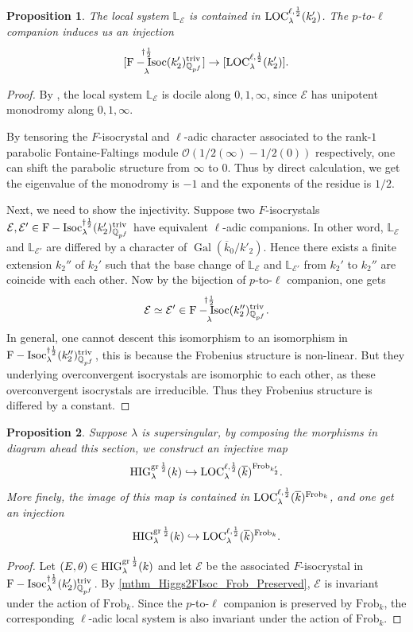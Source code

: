 \documentclass[12pt,twoside]{book}
\theoremstyle{plain}
\newtheorem{proposition}[proposition]{Proposition}
\theoremstyle{definition}
\theoremstyle{remark}
\newcommand{\bL}{{\mathbb L}}
\newcommand{\bQ}{{\mathbb Q}}
\newcommand{\mE}{{\mathcal E}}
\newcommand{\mO}{{\mathcal O}}
\DeclareMathOperator\Gal{Gal}
\DeclareMathOperator{\FIsoc}{F-Isoc}
\numberwithin{equation}{section}
\def\FIsoch{{\FIsoc^{\dagger{1\over 2}}_{\lambda} }}
\def\High{{\mathrm{HIG}^{{\rm gr}\,{1\over 2}}_{\lambda}}}
\def\Loch{{\mathrm{LOC}^{\ell,{1\over 2}}_{\lambda}}}
\def\Frob{\mathrm{Frob}}
\def\bark{{\overline k}_0}
\begin{document}
\begin{proposition} \label{mthm_FIsoc2Loc}
The local system $\bL_\mE$ is contained in $\Loch(k'_2)$. The $p$-to-$\ell$ companion induces us an injection
\[[\FIsoch(k'_2)_{\bQ_{p^f}}^{\rm triv}] \rightarrow [\Loch(k'_2)].\]
\end{proposition}

\begin{proof}
By \cite[ Corollary 2.5.4.]{Ked07}, the local system $\bL_\mE$ is docile along $0,1,\infty$, since $\mE$ has unipotent monodromy along $0,1,\infty$.

By tensoring the $F$-isocrystal and $\ell$-adic character associated to the rank-$1$ parabolic Fontaine-Faltings module $\mO(1/2(\infty)-1/2(0))$ respectively, one can shift the parabolic structure from $\infty$ to $0$. Thus by direct calculation, we get the eigenvalue of the monodromy is $-1$ and the exponents of the residue is $1/2$.

Next, we need to show the injectivity. Suppose two $F$-isocrystals $\mE,\mE'\in \FIsoch(k'_2)_{\bQ_{p^f}}^{\rm triv}$ have equivalent $\ell$-adic companions. In other word, $\bL_\mE$ and $\bL_{\mE'}$ are differed by a character of $\Gal(\bark/k'_2)$. Hence there exists a finite extension $k_2''$ of $k_2'$ such that the base change of $\bL_\mE$ and $\bL_{\mE'}$ from $k_2'$ to $k_2''$ are coincide with each other. Now by the bijection of $p$-to-$\ell$ companion, one gets
\[\mE \simeq \mE' \in \FIsoch(k''_2)_{\bQ_{p^f}}^{\rm triv}.\]
In general, one cannot descent this isomorphism to an isomorphism in $\FIsoch(k''_2)_{\bQ_{p^f}}^{\rm triv}$, this is because the Frobenius structure is non-linear. But they underlying overconvergent isocrystals are isomorphic to each other, as these overconvergent isocrystals are irreducible. Thus they Frobenius structure is differed by a constant.
\end{proof}

\begin{proposition} \label{mthm_HIGk2Lock}
Suppose $\lambda$ is supersingular, by composing the morphisms in diagram ahead this section, we construct an injective map
\[\High(k) \hookrightarrow \Loch(\overline{k})^{\Frob_{k'_2}}.\]
More finely, the image of this map is contained in $\Loch(\overline{k})^{\Frob_{k}}$, and one get an injection
\[\High(k) \hookrightarrow \Loch(\overline{k})^{\Frob_{k}}.\]
\end{proposition}
\begin{proof} Let $(E,\theta)\in \High(k)$ and let $\mE$ be the associated $F$-isocrystal in $\FIsoch(k'_2)^{\rm triv}_{\bQ_{p^f}}$. By \autoref{mthm_Higgs2FIsoc_Frob_Preserved}, $\mE$ is invariant under the action of $\Frob_{k}$. Since the $p$-to-$\ell$ companion is preserved by $\Frob_k$, the corresponding $\ell$-adic local system is also invariant under the action of $\Frob_k$.
\end{proof}
\end{document}
